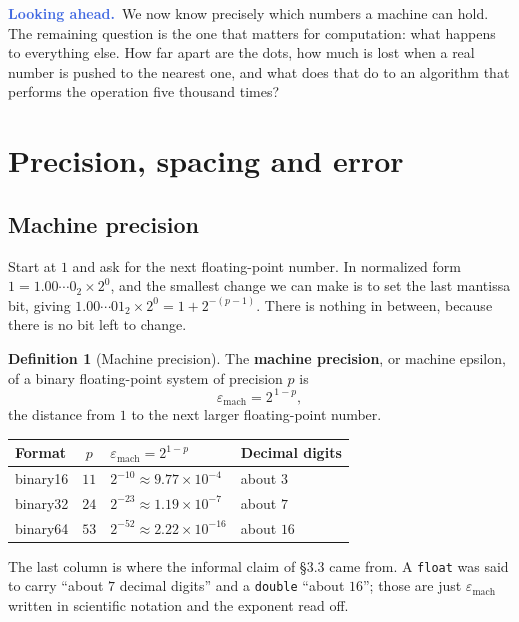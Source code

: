 \documentclass[11pt]{article}
\theoremstyle{plain}
\theoremstyle{definition}
\newtheorem{defn}{Definition}[section]
\theoremstyle{remark}
\newcommand{\lookahead}{\par\smallskip\noindent
  \textbf{\sffamily\textcolor{RoyalBlue}{Looking ahead.}}\ \ignorespaces}
\newcommand{\epsm}{\varepsilon_{\mathrm{mach}}}
\begin{document}
\lookahead We now know precisely which numbers a machine can hold. The
remaining question is the one that matters for computation: what happens to
everything else. How far apart are the dots, how much is lost when a real number
is pushed to the nearest one, and what does that do to an algorithm that
performs the operation five thousand times?

\section{Precision, spacing and error}
\subsection{Machine precision}
Start at $1$ and ask for the next floating-point number. In normalized form
$1 = 1.00\cdots0_{2}\times2^{0}$, and the smallest change we can make is to set
the last mantissa bit, giving $1.00\cdots01_{2}\times2^{0}=1+2^{-(p-1)}$. There
is nothing in between, because there is no bit left to change.

\begin{defn}[Machine precision]
The \textbf{machine precision}, or machine epsilon, of a binary floating-point
system of precision $p$ is
\[
  \epsm = 2^{\,1-p},
\]
the distance from $1$ to the next larger floating-point number.
\end{defn}

\begin{center}
\renewcommand{\arraystretch}{1.3}
\begin{tabular}{@{}l c l l@{}}
\toprule
\textbf{Format} & \textbf{$p$} & \textbf{$\epsm=2^{1-p}$}
  & \textbf{Decimal digits} \\
\midrule
binary16 & $11$ & $2^{-10}\approx9.77\times10^{-4}$  & about $3$ \\
binary32 & $24$ & $2^{-23}\approx1.19\times10^{-7}$  & about $7$ \\
binary64 & $53$ & $2^{-52}\approx2.22\times10^{-16}$ & about $16$ \\
\bottomrule
\end{tabular}
\end{center}

\noindent The last column is where the informal claim of \S3.3 came from. A
\texttt{float} was said to carry ``about $7$ decimal digits'' and a
\texttt{double} ``about $16$''; those are just $\epsm$
written in scientific notation and the exponent read off.
\end{document}
